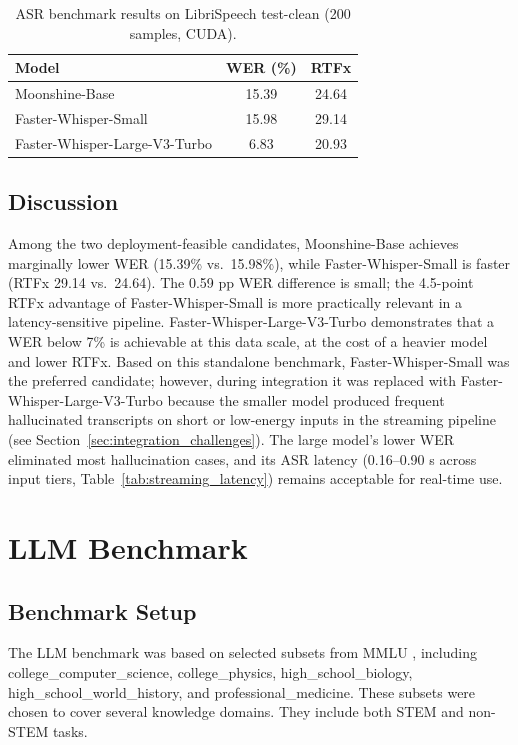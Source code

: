\documentclass[12pt, a4paper]{article}
\begin{document}
\begin{table}[H]
\centering
\caption{ASR benchmark results on LibriSpeech test-clean (200 samples, CUDA).}
\label{tab:asr_results}
\begin{tabular}{lcc}
\toprule
Model & WER (\%) & RTFx \\
\midrule
Moonshine-Base              & 15.39 & 24.64 \\
Faster-Whisper-Small        & 15.98 & 29.14 \\
Faster-Whisper-Large-V3-Turbo & 6.83  & 20.93 \\
\bottomrule
\end{tabular}
\end{table}

\subsection{Discussion}

Among the two deployment-feasible candidates, Moonshine-Base achieves marginally lower WER (15.39\% vs.\ 15.98\%), while Faster-Whisper-Small is faster (RTFx 29.14 vs.\ 24.64). The 0.59 pp WER difference is small; the 4.5-point RTFx advantage of Faster-Whisper-Small is more practically relevant in a latency-sensitive pipeline. Faster-Whisper-Large-V3-Turbo demonstrates that a WER below 7\% is achievable at this data scale, at the cost of a heavier model and lower RTFx. Based on this standalone benchmark, Faster-Whisper-Small was the preferred candidate; however, during integration it was replaced with Faster-Whisper-Large-V3-Turbo because the smaller model produced frequent hallucinated transcripts on short or low-energy inputs in the streaming pipeline (see Section~\ref{sec:integration_challenges}). The large model's lower WER eliminated most hallucination cases, and its ASR latency (0.16--0.90 s across input tiers, Table~\ref{tab:streaming_latency}) remains acceptable for real-time use.

\section{LLM Benchmark}

\subsection{Benchmark Setup}

The LLM benchmark was based on selected subsets from MMLU \cite{hendryckstest2021}, including college\_computer\_science, college\_physics,  high\_school\_biology, high\_school\_world\_history, and professional\_medicine. These subsets were chosen to cover several knowledge domains. They include both STEM and non-STEM tasks.
\end{document}
